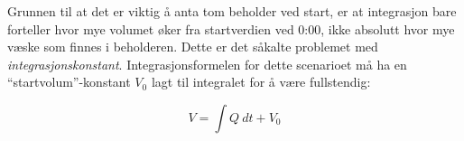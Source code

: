





Grunnen til at det er viktig å anta tom beholder ved start, er at integrasjon bare forteller hvor mye volumet øker fra startverdien ved 0:00, ikke absolutt hvor mye væske som finnes i beholderen. Dette er det såkalte problemet med {\it integrasjonskonstant}. Integrasjonsformelen for dette scenarioet må ha en ``startvolum''-konstant $V_0$ lagt til integralet for å være fullstendig:

$$V = \int Q \> dt + V_0$$


